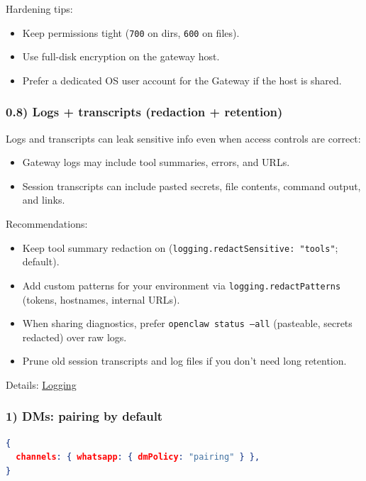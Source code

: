 Hardening tips:

\begin{itemize}
  \item Keep permissions tight (\texttt{700} on dirs, \texttt{600} on files).
  \item Use full-disk encryption on the gateway host.
  \item Prefer a dedicated OS user account for the Gateway if the host is shared.
\end{itemize}


\subsubsection{0.8) Logs + transcripts (redaction + retention)}


Logs and transcripts can leak sensitive info even when access controls are correct:

\begin{itemize}
  \item Gateway logs may include tool summaries, errors, and URLs.
  \item Session transcripts can include pasted secrets, file contents, command output, and links.
\end{itemize}


Recommendations:

\begin{itemize}
  \item Keep tool summary redaction on (\texttt{logging.redactSensitive: "tools"}; default).
  \item Add custom patterns for your environment via \texttt{logging.redactPatterns} (tokens, hostnames, internal URLs).
  \item When sharing diagnostics, prefer \texttt{openclaw status --all} (pasteable, secrets redacted) over raw logs.
  \item Prune old session transcripts and log files if you don’t need long retention.
\end{itemize}


Details: \href{/gateway/logging}{Logging}

\subsubsection{1) DMs: pairing by default}


\begin{lstlisting}[language=json]
{
  channels: { whatsapp: { dmPolicy: "pairing" } },
}
\end{lstlisting}


